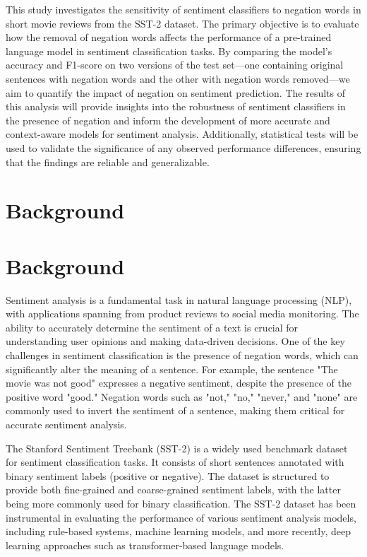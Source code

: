 \documentclass{article}
\begin{document}
This study investigates the sensitivity of sentiment classifiers to negation words in short movie reviews from the SST-2 dataset. The primary objective is to evaluate how the removal of negation words affects the performance of a pre-trained language model in sentiment classification tasks. By comparing the model's accuracy and F1-score on two versions of the test set—one containing original sentences with negation words and the other with negation words removed—we aim to quantify the impact of negation on sentiment prediction. The results of this analysis will provide insights into the robustness of sentiment classifiers in the presence of negation and inform the development of more accurate and context-aware models for sentiment analysis. Additionally, statistical tests will be used to validate the significance of any observed performance differences, ensuring that the findings are reliable and generalizable.
\section{Background}
\section*{Background}

Sentiment analysis is a fundamental task in natural language processing (NLP), with applications spanning from product reviews to social media monitoring. The ability to accurately determine the sentiment of a text is crucial for understanding user opinions and making data-driven decisions. One of the key challenges in sentiment classification is the presence of negation words, which can significantly alter the meaning of a sentence. For example, the sentence "The movie was not good" expresses a negative sentiment, despite the presence of the positive word "good." Negation words such as "not," "no," "never," and "none" are commonly used to invert the sentiment of a sentence, making them critical for accurate sentiment analysis.

The Stanford Sentiment Treebank (SST-2) is a widely used benchmark dataset for sentiment classification tasks. It consists of short sentences annotated with binary sentiment labels (positive or negative). The dataset is structured to provide both fine-grained and coarse-grained sentiment labels, with the latter being more commonly used for binary classification. The SST-2 dataset has been instrumental in evaluating the performance of various sentiment analysis models, including rule-based systems, machine learning models, and more recently, deep learning approaches such as transformer-based language models.
\end{document}
